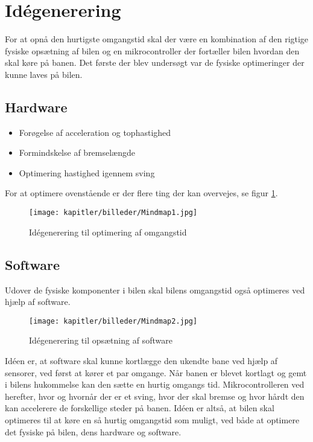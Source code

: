 
\newpage
\section{Idégenerering}
For at opnå den hurtigste omgangstid skal der være en kombination af den rigtige fysiske opsætning af bilen og en mikrocontroller der fortæller bilen hvordan den skal køre på banen.
Det første der blev undersøgt var de fysiske optimeringer der kunne laves på bilen.

\subsection{Hardware}

\begin{itemize}
\item Forøgelse af acceleration og tophastighed
\item Formindskelse af bremselængde
\item Optimering hastighed igennem sving
\end{itemize}
For at optimere ovenstående er der flere ting der kan overvejes, se figur \ref{fig:mindmap1}.

\begin{figure}[ht]
    \centering
    \texttt{[image: kapitler/billeder/Mindmap1.jpg]}
    \caption{Idégenerering til optimering af omgangstid}
    \label{fig:mindmap1}
\end{figure}



\subsection{Software}
Udover de fysiske komponenter i bilen skal bilens omgangstid også optimeres ved hjælp af software.


\begin{figure}[ht]
    \centering
    \texttt{[image: kapitler/billeder/Mindmap2.jpg]}
    \caption{Idégenerering til opsætning af software}
    \label{fig:mindmap2}
\end{figure}


Idéen er, at software skal kunne kortlægge den ukendte bane ved hjælp af sensorer, ved først at kører et par omgange.
Når banen er blevet kortlagt og gemt i bilens hukommelse kan den sætte en hurtig omgangs tid.
Mikrocontrolleren ved herefter, hvor og hvornår der er et sving, hvor der skal bremse og hvor hårdt den kan accelerere de forskellige steder på banen.
Idéen er altså, at bilen skal optimeres til at køre en så hurtig omgangstid som muligt, ved både at optimere det fysiske på bilen, dens hardware og software.
